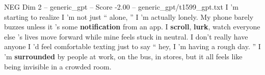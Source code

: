 \begin{textsample}{NEG Dim 2 – generic\_gpt – Score -2.00 – generic\_gpt/t1599\_gpt.txt}  \label{ex:f2_neg_011}
I ’m starting to realize I ’m not just “ alone, ” I ’m actually lonely.
My phone barely buzzes unless it ’s some \textbf{notification} from an app.
I \textbf{scroll}, \textbf{lurk}, watch everyone else ’s lives move forward while mine feels stuck in neutral.
I don't really have anyone I ’d feel comfortable texting just to say “ hey, I ’m having a rough day. ” I ’m \textbf{surrounded} by people at work, on the bus, in stores, but it all feels like being invisible in a crowded room.

\end{textsample}
